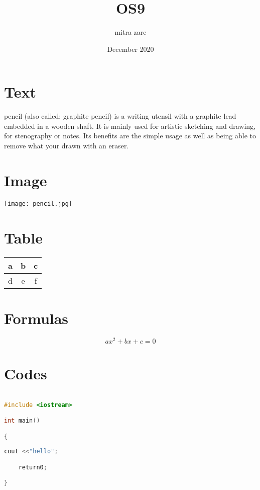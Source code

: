 \documentclass{article}
\title{OS9}
\author{mitra zare}
\date{December 2020}
\begin{document}
\maketitle

\section{Text}

pencil (also called: graphite pencil) is a writing utensil with a graphite lead embedded in a wooden shaft. It is mainly used for artistic sketching and drawing, for stenography or notes. Its benefits are the simple usage as well as being able to remove what your drawn with an eraser.
\section{Image}

\texttt{[image: pencil.jpg]}

\section{Table}
\begin{tabular}{|c|c|c|}

\hline
a & b & c\\

\hline

 d & e & f\\
\hline

\end{tabular}

\section{Formulas}
 
\[ ax^2 + bx + c = 0 \]

\section{Codes}

\begin{lstlisting}[language=C++]

#include <iostream>

int main()

{
    
cout <<"hello";

    return0;

}

\end{lstlisting}
\end{document}
